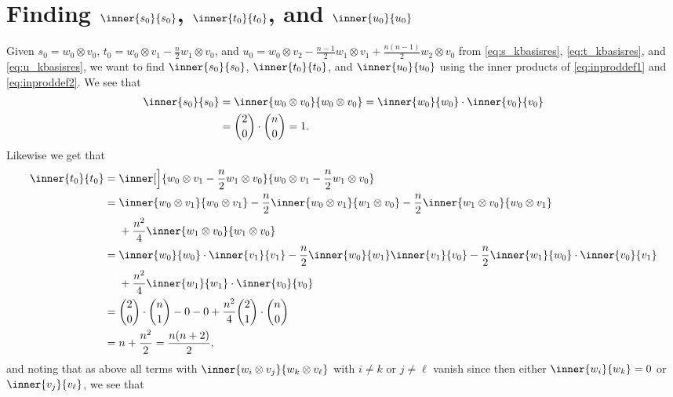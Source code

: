 \section{\texorpdfstring{Finding $\inner{s_0}{s_0}$, $\inner{t_0}{t_0}$, and $\inner{u_0}{u_0}$}{Finding inner products in V(2) tensor V(n)}}\label{sec:innerproductscalc}

Given $s_0=w_0\otimes v_0$, $t_0=w_0\otimes v_1 - \tfrac{n}{2}w_1\otimes v_0$, and $u_0=w_0\otimes v_2 - \tfrac{n-1}{2}w_1\otimes v_1 + \tfrac{n(n-1)}{2}w_2\otimes v_0$ from \cref{eq:s_kbasisres}, \cref{eq:t_kbasisres}, and \cref{eq:u_kbasisres}, we want to find $\inner{s_0}{s_0}$, $\inner{t_0}{t_0}$, and $\inner{u_0}{u_0}$ using the inner products of \cref{eq:inproddef1} and \cref{eq:inproddef2}. We see that
\begin{align*}
  \inner{s_0}{s_0} &= \inner{w_0\otimes v_0}{w_0\otimes v_0} = \inner{w_0}{w_0} \cdot \inner{v_0}{v_0} \\
  &= \binom{2}{0}\cdot\binom{n}{0} = 1.
\end{align*}
Likewise we get that
\begin{align*}
  \inner{t_0}{t_0} &= \inner[\Big]{w_0\otimes v_1 - \dfrac{n}{2}w_1\otimes v_0}{w_0\otimes v_1 - \dfrac{n}{2}w_1\otimes v_0} \\
                   &= \inner{w_0\otimes v_1}{w_0\otimes v_1} - \dfrac{n}{2}\inner{w_0\otimes v_1}{w_1\otimes v_0} - \dfrac{n}{2}\inner{w_1\otimes v_0}{w_0\otimes v_1} \\*
                   &\phantom{{}={}}{} + \dfrac{n^2}{4}\inner{w_1\otimes v_0}{w_1\otimes v_0} \\
                   &= \inner{w_0}{w_0}\cdot\inner{v_1}{v_1} - \dfrac{n}{2}\inner{w_0}{w_1}\inner{v_1}{v_0} - \dfrac{n}{2}\inner{w_1}{w_0}\cdot\inner{v_0}{v_1} \\*
                   &\phantom{{}={}}{} + \dfrac{n^2}{4}\inner{w_1}{w_1}\cdot\inner{v_0}{v_0} \\
                   &= \binom{2}{0}\cdot\binom{n}{1} - 0 - 0 + \dfrac{n^2}{4}\binom{2}{1}\cdot\binom{n}{0} \\
                   &= n + \dfrac{n^2}{2} = \dfrac{n(n+2)}{2},
\end{align*}
and noting that as above all terms with $\inner{w_i\otimes v_j}{w_k\otimes v_\ell}$ with $i\neq k$ or $j\neq \ell$ vanish since then either $\inner{w_i}{w_k}=0$ or $\inner{v_j}{v_\ell}$, we see that
